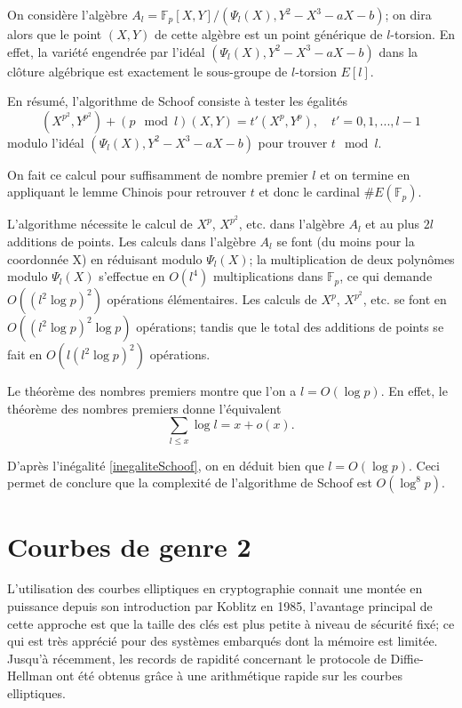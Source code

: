 \documentclass[a4paper,12pt]{article}
\theoremstyle{definition}
\theoremstyle{remark}
\numberwithin{equation}{section}
\begin{document}
On considère l'algèbre $A_l=\mathbb{F}_p[X,Y]/(\Psi_l(X),Y^2-X^3-aX-b)$; on dira alors que le point $(X,Y)$ de cette algèbre est un point générique de $l$-torsion. En effet, la variété engendrée par l'idéal $(\Psi_l(X),Y^2-X^3-aX-b)$ dans la clôture algébrique est exactement le sous-groupe de $l$-torsion $E[l]$.

En résumé, l'algorithme de Schoof consiste à tester les égalités
\begin{equation}
\label{polCarFrob}
(X^{p^2},Y^{p^2}) + (p \mod l)(X,Y) = t'(X^p,Y^p), \quad t' = 0,1,...,l-1
\end{equation}
modulo l'idéal $(\Psi_l(X),Y^2-X^3-aX-b)$ pour trouver $t \mod l$.

On fait ce calcul pour suffisamment de nombre premier $l$ et on termine en appliquant le lemme Chinois pour retrouver $t$ et donc le cardinal $\#E(\mathbb{F}_p)$.

L'algorithme nécessite le calcul de $X^p$, $X^{p^2}$, etc. dans l'algèbre $A_l$ et au plus $2l$ additions de points. Les calculs dans l'algèbre $A_l$ se font (du moins pour la coordonnée X) en réduisant modulo $\Psi_l(X)$; la multiplication de deux polynômes modulo $\Psi_l(X)$ s'effectue en $O(l^4)$ multiplications dans $\mathbb{F}_p$, ce qui demande $O((l^2\log p)^2)$ opérations élémentaires. Les calculs de $X^p$, $X^{p^2}$, etc. se font en $O((l^2\log p)^2\log p)$ opérations; tandis que le total des additions de points se fait en $O(l(l^2\log p)^2)$ opérations.

Le théorème des nombres premiers montre que l'on a $l = O(\log p)$. En effet, le théorème des nombres premiers donne l'équivalent
$$\sum_{l \leq x}\log l = x + o(x).$$

D'après l'inégalité \ref{inegaliteSchoof}, on en déduit bien que $l = O(\log p)$. Ceci permet de conclure que la complexité de l'algorithme de Schoof est $O(\log^8 p)$.

\section{Courbes de genre 2}

L'utilisation des courbes elliptiques en cryptographie connait une montée en puissance depuis son introduction par Koblitz en 1985, l'avantage principal de cette approche est que la taille des clés est plus petite à niveau de sécurité fixé; ce qui est très apprécié pour des systèmes embarqués dont la mémoire est limitée. Jusqu'à récemment, les records de rapidité concernant le protocole de Diffie-Hellman ont été obtenus grâce à une arithmétique rapide sur les courbes elliptiques.
\end{document}

